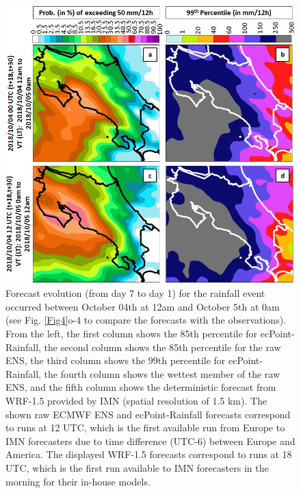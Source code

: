 \documentclass[twocol]{ametsocV5} %
\begin{document}
\begin{figure}
\centerline{\includegraphics[width=39pc]{manuscript/Figures/Fig7.jpg}}
\caption{Forecast evolution (from day 7 to day 1) for the rainfall event occurred between October 04th at 12am and October 5th at 0am (see Fig. \ref{Fig4}o-4 to compare the forecasts with the observations). From the left, the first column shows the 85th percentile for ecPoint-Rainfall, the second column shows the 85th percentile for the raw ENS, the third column shows the 99th percentile for ecPoint-Rainfall, the fourth column shows the wettest member of the raw ENS, and the fifth column shows the deterministic forecast from WRF-1.5 provided by IMN (spatial resolution of 1.5 km). The shown raw ECMWF ENS and ecPoint-Rainfall forecasts correspond to runs at 12 UTC, which is the first available run from Europe to IMN forecasters due to time difference (UTC-6) between Europe and America. The displayed WRF-1.5 forecasts correspond to runs at 18 UTC, which is the first run available to IMN forecasters in the morning for their in-house models.}
\label{Fig7}
\end{figure}
\end{document}
